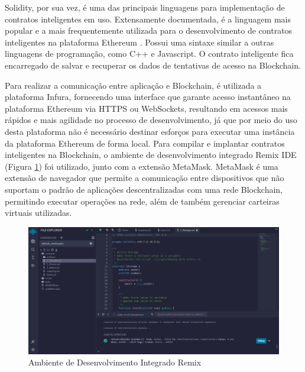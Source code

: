 Solidity, por sua vez, é uma das principais linguagens para implementação de contratos inteligentes em uso. Extensamente documentada, é a linguagem mais popular e a mais frequentemente utilizada para o desenvolvimento de contratos inteligentes na plataforma Ethereum \cite{Antonopoulos2018-jt}. Possui uma sintaxe similar a outras linguagens de programação, como C++ e Javascript. O contrato inteligente fica encarregado de salvar e recuperar os dados de tentativas de acesso na Blockchain.

Para realizar a comunicação entre aplicação e Blockchain, é utilizada a plataforma Infura, fornecendo uma interface que garante acesso instantâneo na plataforma Ethereum via HTTPS ou WebSockets, resultando em acessos mais rápidos e mais agilidade no processo de desenvolvimento, já que por meio do uso desta plataforma não é necessário destinar esforços para executar uma instância da plataforma Ethereum de forma local. Para compilar e implantar contratos inteligentes na Blockchain, o ambiente de desenvolvimento integrado Remix IDE (Figura \ref{fig:remix}) foi utilizado, junto com a extensão MetaMask. MetaMask é uma extensão de navegador que permite a comunicação entre dispositivos que não suportam o padrão de aplicações descentralizadas com uma rede Blockchain, permitindo executar operações na rede, além de também gerenciar carteiras virtuais utilizadas.

\begin{figure}
    \centering
    \includegraphics[width=1\textwidth]{img/Cap1/remix ide.png}
    \caption{Ambiente de Desenvolvimento Integrado Remix}
    \label{fig:remix}
\end{figure}
